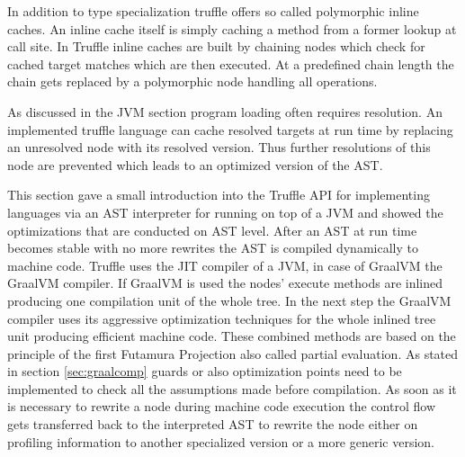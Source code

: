 In addition to type specialization truffle offers so called polymorphic inline caches. \cite{ChambOpti} An inline cache itself is simply caching a method from a former lookup at call site. In Truffle inline caches are built by chaining nodes which check for cached target matches which are then executed. At a predefined chain length the chain gets replaced by a polymorphic node handling all operations.

As discussed in the JVM section program loading often requires resolution. An implemented truffle language can cache resolved targets at run time by replacing an unresolved node with its resolved version. Thus further resolutions of this node are prevented which leads to an optimized version of the AST.

This section gave a small introduction into the Truffle API for implementing languages via an AST interpreter for running on top of a JVM and showed the optimizations that are conducted on AST level. After an AST at run time becomes stable with no more rewrites the AST is compiled dynamically to machine code. Truffle uses the JIT compiler of a JVM, in case of GraalVM the GraalVM compiler. If GraalVM is used the nodes' execute methods are inlined producing one compilation unit of the whole tree. In the next step the GraalVM compiler uses its aggressive optimization techniques for the whole inlined tree unit producing efficient machine code. These combined methods are based on the principle of the first Futamura Projection also called partial evaluation. \cite{FutaPart} As stated in section \ref{sec:graalcomp} guards or also optimization points need to be implemented to check all the assumptions made before compilation. As soon as it is necessary to rewrite a node during machine code execution the control flow gets transferred back to the interpreted AST to rewrite the node either on profiling information to another specialized version or a more generic version. \cite{ChambDeopt}

